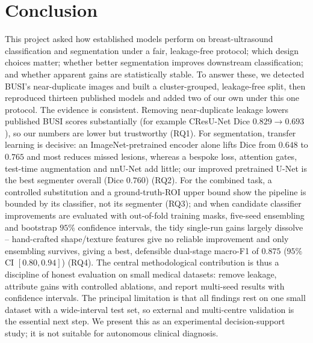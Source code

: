\documentclass[11pt]{article}
\begin{document}
\section{Conclusion}
\label{sec:conclusion}
This project asked how established models perform on breast-ultrasound
classification and segmentation under a fair, leakage-free protocol; which design
choices matter; whether better segmentation improves downstream classification; and
whether apparent gains are statistically stable. To answer these, we detected
BUSI's near-duplicate images and built a cluster-grouped, leakage-free split, then
reproduced thirteen published models and added two of our own under this one
protocol. The evidence is consistent. Removing near-duplicate leakage lowers
published BUSI scores substantially (for example CResU-Net Dice $0.829\to0.693$),
so our numbers are lower but trustworthy (RQ1). For segmentation, transfer learning
is decisive: an ImageNet-pretrained encoder alone lifts Dice from $0.648$ to
$0.765$ and most reduces missed lesions, whereas a bespoke loss, attention gates,
test-time augmentation and nnU-Net add little; our improved pretrained U-Net is the
best segmenter overall (Dice $0.760$) (RQ2). For the combined task, a controlled
substitution and a ground-truth-ROI upper bound show the pipeline is bounded by its
classifier, not its segmenter (RQ3); and when candidate classifier improvements are
evaluated with out-of-fold training masks, five-seed ensembling and bootstrap
$95\%$ confidence intervals, the tidy single-run gains largely dissolve --
hand-crafted shape/texture features give no reliable improvement and only
ensembling survives, giving a best, defensible dual-stage macro-F1 of $0.875$
($95\%$ CI $[0.80,0.94]$) (RQ4). The central methodological contribution is thus a
discipline of honest evaluation on small medical datasets: remove leakage,
attribute gains with controlled ablations, and report multi-seed results with
confidence intervals. The principal limitation is that all findings rest on one
small dataset with a wide-interval test set, so external and multi-centre
validation is the essential next step. We present this as an experimental
decision-support study; it is not suitable for autonomous clinical diagnosis.
\end{document}

